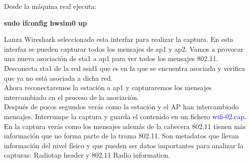 \documentclass[12pt, a4paper]{report}
\begin{document}
Desde la máquina real ejecuta:
\begin{center}
	\textbf{sudo ifconfig hwsim0 up}
\end{center}
Lanza Wireshark seleccionado esta interfaz para realizar la captura. En esta interfaz se pueden
capturar todos los mensajes de ap1 y ap2. Vamos a provocar una nueva asociación de sta1 a ap1 para
ver todos los mensajes 802.11.\\

Desconecta sta1 de la red ssid1 que es en la que se encuentra asociada y verifica que ya no está
asociada a dicha red.\\

Ahora reconectaremos la estación a ap1 y capturaremos los mensajes intercambiado en el proceso
de la asociación.\\

Después de pocos segundos verás como la estación y el AP han intercambiado mensajes. Interrumpe
la captura y guarda el contenido en un fichero \textcolor{blue}{wifi-02.cap}.\\

En la captura verás como los mensajes además de la cabecera 802.11 tienen más información que
no forma parte de la trama 802.11. Son metadatos que llevan información del nivel físico y que pueden
ser datos importantes para analizar la capturas: Radiotap header y 802.11 Radio information.\\
\end{document}

